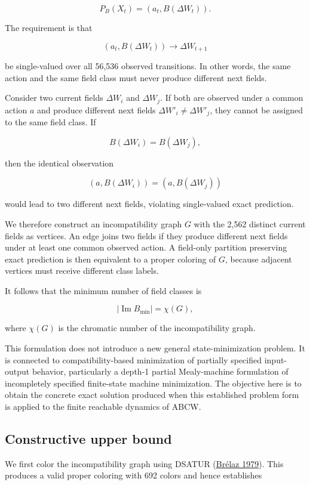 \documentclass[
  11pt,
]{article}
\begin{document}
\[{P_B(X_t)=(a_t,B(\Delta W_t)).}\]

The requirement is that

\[{(a_t,B(\Delta W_t))\longrightarrow\Delta W_{t+1}}\]

be single-valued over all 56,536 observed transitions. In other words,
the same action and the same field class must never produce different
next fields.

Consider two current fields \({\Delta W_i}\) and \({\Delta W_j}\). If
both are observed under a common action \({a}\) and produce different
next fields \({\Delta W'_i\neq\Delta W'_j}\), they cannot be assigned to
the same field class. If

\[{B(\Delta W_i)=B(\Delta W_j),}\]

then the identical observation

\[{(a,B(\Delta W_i))=(a,B(\Delta W_j))}\]

would lead to two different next fields, violating single-valued exact
prediction.

We therefore construct an incompatibility graph \({G}\) with the 2,562
distinct current fields as vertices. An edge joins two fields if they
produce different next fields under at least one common observed action.
A field-only partition preserving exact prediction is then equivalent to
a proper coloring of \({G}\), because adjacent vertices must receive
different class labels.

It follows that the minimum number of field classes is

\[{|\operatorname{Im}B_{\min}|=\chi(G),}\]

where \({\chi(G)}\) is the chromatic number of the incompatibility
graph.

This formulation does not introduce a new general state-minimization
problem. It is connected to compatibility-based minimization of
partially specified input-output behavior, particularly a depth-1
partial Mealy-machine formulation of incompletely specified finite-state
machine minimization. The objective here is to obtain the concrete exact
solution produced when this established problem form is applied to the
finite reachable dynamics of ABCW.

\hypertarget{constructive-upper-bound}{%
\subsection{Constructive upper bound}\label{constructive-upper-bound}}

We first color the incompatibility graph using DSATUR
(\protect\hyperlink{ref-brelaz1979}{Brélaz 1979}). This produces a valid
proper coloring with 692 colors and hence establishes
\end{document}
